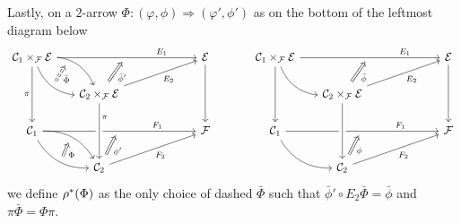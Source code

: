 \documentclass[a4paper,10pt
,draft
]{article}%
\numberwithin{equation}{section}
\numberwithin{figure}{section}
\theoremstyle{definition} %
\newcommand{\1}{\ensuremath{\mathbbm 1}}%
\begin{document}
Lastly, on a $2$-arrow $\Phi \colon (\varphi,\phi) \Rightarrow (\varphi',\phi')$
as on the bottom of the leftmost diagram below
\begin{equation}\label{PULL2ARR EQ}
\begin{tikzcd}[column sep = 16pt, row sep = 17pt]
	\mathcal{C}_1 \times_{\mathcal{F}} \mathcal{E} 
	\ar{rrrrr}[name=toE]{}[near end]{E_1} 
	\ar[bend left]{rd}[near start, swap, name=FE]{}
	\ar[bend right]{rd}[name=FFE]{} \ar{dd}[swap]{\pi}
	&&&
	&&
	\mathcal{E}  \ar{dd}
&&
	\mathcal{C}_1 \times_{\mathcal{F}} \mathcal{E} 
	\ar{rrrrr}[name=toE2]{}[near end]{E_1} 
	\ar[bend right]{rd}{} \ar{dd}
	&&&
	&&
	\mathcal{E}  \ar{dd}
\\
	&
	|[alias=DBE]|
	\mathcal{C}_2 \times_{\mathcal{F}} \mathcal{E} \ar{rrrru}[swap]{E_2} &&&&
&&
	&
	|[alias=DBE2]|
	\mathcal{C}_2 \times_{\mathcal{F}} \mathcal{E} \ar{rrrru}[swap]{E_2} &&&&
\\
	\mathcal{C}_1 \ar{rrrrr}[name=toB]{}[near end]{F_1} 
	\ar[bend left]{rd}[swap,name=FF]{}
	\ar[bend right]{rd} [name=F]{}
	&&&
	&&
	\mathcal{F} 
&&
	\mathcal{C}_1 \ar{rrrrr}[name=toB2]{}[near end]{F_1} 
	\ar[bend right]{rd}{}
	&&&
	&&
	\mathcal{F} 
\\
	&
	|[alias=D]| \mathcal{C}_2 \ar{rrrru}[swap]{F_2} &&&&
&&
	&
	|[alias=D2]|
	\mathcal{C}_2 \ar{rrrru}[swap]{F_2} &&&&
\arrow[Rightarrow, from=DBE, to=toE, shorten <=0.15cm,shorten >=0.15cm
,swap,"\bar{\phi}'"
]
\arrow[Rightarrow, from=DBE2, to=toE2, shorten <=0.15cm,shorten >=0.15cm
,swap,"\bar{\phi}"
]
\arrow[Rightarrow, from=D, to=toB, shorten <=0.15cm,shorten >=0.15cm,swap,"\phi'"]
\arrow[Rightarrow, from=D2, to=toB2, shorten <=0.15cm,shorten >=0.15cm,swap,"\phi"]
\arrow[Rightarrow, from=F, to=FF, shorten <=0cm,shorten >=0cm,swap,"\Phi"]
\arrow[Rightarrow, from=FFE, to=FE, shorten <=0cm,shorten >=0cm,swap,dashed,"\bar{\Phi}"]
\arrow[from=DBE, to=D, crossing over,near start,"\pi"]
\arrow[from=DBE2, to=D2, crossing over]
\end{tikzcd}
\end{equation}
we define $\rho^{\**}(\Phi)$
as the only choice of dashed $\bar{\Phi}$
such that $\bar{\phi}' \circ E_2\bar{\Phi} = \bar{\phi}$
and $\pi \bar{\Phi} = \Phi \pi$.

\end{document}
